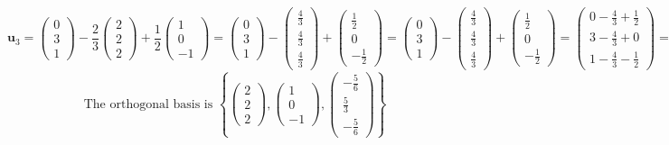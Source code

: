 \documentclass[a3paper,12pt]{extarticle} %
\begin{document}
\begin{enumerate}
\begin{enumerate}
\[        \]
        \[
            \mathbf{u}_3 = \begin{pmatrix} 0 \\ 3 \\ 1 \end{pmatrix} - \frac{2}{3} \begin{pmatrix} 2 \\ 2 \\ 2 \end{pmatrix} + \frac{1}{2} \begin{pmatrix} 1 \\ 0 \\ -1 \end{pmatrix} = \begin{pmatrix} 0 \\ 3 \\ 1 \end{pmatrix} - \begin{pmatrix} \frac{4}{3} \\ \frac{4}{3} \\ \frac{4}{3} \end{pmatrix} + \begin{pmatrix} \frac{1}{2} \\ 0 \\ -\frac{1}{2} \end{pmatrix} = \begin{pmatrix} 0 \\ 3 \\ 1 \end{pmatrix} - \begin{pmatrix} \frac{4}{3} \\ \frac{4}{3} \\ \frac{4}{3} \end{pmatrix} + \begin{pmatrix} \frac{1}{2} \\ 0 \\ -\frac{1}{2} \end{pmatrix} = \begin{pmatrix} 0 - \frac{4}{3} + \frac{1}{2} \\ 3 - \frac{4}{3} + 0 \\ 1 - \frac{4}{3} - \frac{1}{2} \end{pmatrix} = \begin{pmatrix} -\frac{5}{6} \\ \frac{5}{3} \\ -\frac{5}{6} \end{pmatrix}
        \]
        \[
            \text{The orthogonal basis is } \left\{ \begin{pmatrix} 2 \\ 2 \\ 2 \end{pmatrix}, \begin{pmatrix} 1 \\ 0 \\ -1 \end{pmatrix}, \begin{pmatrix} -\frac{5}{6} \\ \frac{5}{3} \\ -\frac{5}{6} \end{pmatrix} \right\}
\]
\end{enumerate}
\end{enumerate}
\end{document}
